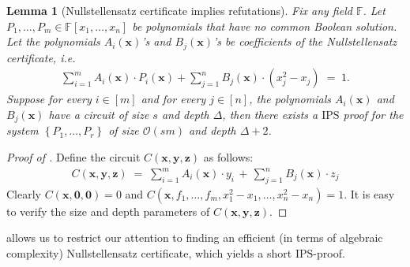 \documentclass[11pt]{article}
\newtheorem{lemma}[theorem]{Lemma}
\newcommand{\bigO}{\mathcal{O}}
\newcommand{\set}[1]{\left\{ #1 \right\}}
\newcommand{\F}{\mathbb{F}}
\newcommand{\comment}[2]{\marginpar{\tiny{\textbf{#1: }\textit{#2}}}}
\newcommand{\nl}[1]{\comment{NL}{#1}}
\newcommand{\IPS}{\mathrm{IPS}}
\begin{document}
\begin{lemma}[Nullstellensatz certificate implies refutations]\label{lemma:nullstellensatz-refutations}
Fix any field $\F$. Let $P_{1},\ldots,P_{m} \in \F[x_{1},\ldots,x_{n}]$ be polynomials that have no common Boolean solution. Let the polynomials $A_{i}(\mathbf{x})$'s and $B_{j}(\mathbf{x})$'s be coefficients of the Nullstellensatz certificate, i.e.
\begin{align*}
    \sum_{i=1}^{m} A_{i}(\mathbf{x}) \cdot P_{i}(\mathbf{x}) + \sum_{j=1}^{n} B_{j}(\mathbf{x}) \cdot (x_{j}^{2} - x_{j}) \; = \; 1.
\end{align*}
Suppose for every $i \in [m]$ and for every $j \in [n]$, the polynomials $A_{i}(\mathbf{x})$ and $B_{j}(\mathbf{x})$ have a circuit of size $s$ and depth $\Delta$, then there exists a $\IPS$ proof for the system $\set{P_{1},\ldots,P_{r}}$ of size $\bigO(sm)$ and depth $\Delta+2$.
\end{lemma}
\begin{proof}[Proof of ]
Define the circuit $C(\mathbf{x}, \mathbf{y}, \mathbf{z})$ as follows:
\begin{align*}
    C(\mathbf{x}, \mathbf{y}, \mathbf{z}) \; = \; \sum_{i=1}^{m} A_{i}(\mathbf{x}) \cdot y_{i} \, + \, \sum_{j=1}^{n} B_{j}(\mathbf{x}) \cdot z_{j}
\end{align*}
Clearly $C(\mathbf{x}, \mathbf{0}, \mathbf{0}) = 0$ and $C(\mathbf{x}, f_{1},\ldots,f_{m}, x_{1}^{2}-x_{1},\ldots,x_{n}^{2}-x_{n}) = 1$. It is easy to verify the size and depth parameters of $C(\mathbf{x}, \mathbf{y}, \mathbf{z})$.
\end{proof} 
 allows us to restrict our attention to finding an efficient (in terms of algebraic complexity) Nullstellensatz certificate, which yields a short $\IPS$-proof.




\newcommand{\Coeff}{\ensuremath{\operatorname{Coeff}}}
\newcommand{\bfCoeff}{\ensuremath{\operatorname{\mathbf{Coeff}}}}
\newcommand{\Eval}{\ensuremath{\operatorname{Eval}}}
\newcommand{\bfEval}{\ensuremath{\operatorname{\mathbf{Eval}}}}
\newcommand{\bfalpha}{\ensuremath{\boldsymbol{\alpha}}}
\newcommand{\bfw}{\ensuremath{\mathbf{w}}}
\newcommand{\Aw}{\ensuremath{A_\bfw}}
\newcommand{\Bw}{\ensuremath{B_\bfw}}
\renewcommand{\char}{\ensuremath{\operatorname{char}}}
\newcommand{\bbF}{\ensuremath{\F}}
\newcommand{\ksw}{\ensuremath{\operatorname{ks}_{\bfw}}}
\newcommand{\kswnew}[1]{\ensuremath{\operatorname{ks}_{\bfw,#1}}}
\end{document}
